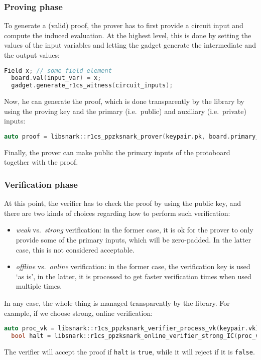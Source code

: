 \subsubsection*{Proving phase}
To generate a (valid) proof, the prover has to first provide a circuit input and compute the 
induced evaluation. 
At the highest level, this is done by setting the values of the input variables and letting the 
gadget generate the intermediate and the output values:
\begin{lstlisting}[language=C++]
  Field x; // some field element
  board.val(input_var) = x;
  gadget.generate_r1cs_witness(circuit_inputs);
\end{lstlisting}
Now, he can generate the proof, which is done transparently by the library by using the 
proving key and the primary (i.e.\ public) and auxiliary (i.e.\ private) inputs:
\begin{lstlisting}[language=C++]
  auto proof = libsnark::r1cs_ppzksnark_prover(keypair.pk, board.primary_input(), board.auxiliary_input());
\end{lstlisting}
Finally, the prover can make public the primary inputs of the protoboard together with the
proof.

\subsubsection*{Verification phase}
At this point, the verifier has to check the proof by using the public key, and there are two 
kinds of choices regarding how to perform such verification: 
\begin{itemize}
  \item \emph{weak} vs.\  \emph{strong} verification: in the former case, it is ok for the prover 
        to only provide some of the primary inputs, which will be zero-padded. 
        In the latter case, this is not considered acceptable.
  \item \emph{offline} vs.\  \emph{online} verification: in the former case, the verification key 
        is used `as is', in the latter, it is processed to get faster verification times when used 
        multiple times.
\end{itemize}
In any case, the whole thing is managed transparently by the library.
For example, if we choose strong, online verification:
\begin{lstlisting}[language=C++]
  auto proc_vk = libsnark::r1cs_ppzksnark_verifier_process_vk(keypair.vk);
  bool halt = libsnark::r1cs_ppzksnark_online_verifier_strong_IC(proc_vk, board.primary_input(), proof);
\end{lstlisting}
The verifier will accept the proof if \texttt{halt} is \texttt{true}, while it will reject if it 
is \texttt{false}.

